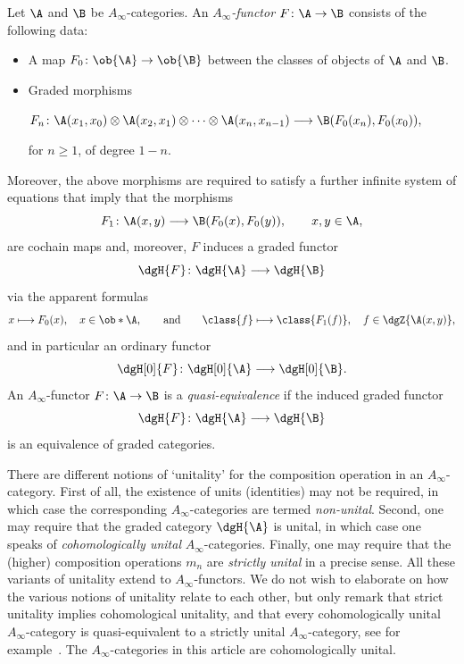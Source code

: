 \documentclass[a4paper]{amsart}
\begin{document}
Let $\A$ and $\B$ be $A_\infty$-categories. An \emph{$A_\infty$-functor}
$F\colon\A\to\B$ consists of the following data:
\begin{itemize}
\item A map $F_0\colon\ob{\A}\to\ob{\B}$ between the classes of objects of $\A$
  and $\B$.
\item Graded morphisms
  \begin{center}
    $F_n\colon\A(x_1,x_0)\otimes\A(x_2,x_1)\otimes\cdots\otimes\A(x_n,x_{n-1})\longrightarrow\B(F_0(x_n),F_0(x_0)),$
  \end{center}
  for $n\geq 1$, of degree $1-n$.
\end{itemize}
Moreover, the above morphisms are required to satisfy a further infinite system
of equations that imply that the morphisms
\[
  F_1\colon\A(x,y)\longrightarrow\B(F_0(x),F_0(y)),\qquad x,y\in\A,
\]
are cochain maps and, moreover, $F$ induces a graded functor
\[
  \dgH{F}\colon\dgH{\A}\longrightarrow\dgH{\B}
\]
via the apparent formulas
\[
  x\longmapsto F_0(x),\quad x\in\ob*{\A},\qquad\text{and}\qquad
  \class{f}\longmapsto \class{F_1(f)},\quad f\in\dgZ{\A(x,y)},
\]
and in particular an ordinary functor
\[
  \dgH[0]{F}\colon\dgH[0]{\A}\longrightarrow\dgH[0]{\B}.
\]
An $A_\infty$-functor $F\colon\A\to\B$ is a \emph{quasi-equivalence} if the
induced graded functor
\[
  \dgH{F}\colon\dgH{\A}\longrightarrow\dgH{\B}
\]
is an equivalence of graded categories.

\begin{remark}
  There are different notions of `unitality' for the composition operation in an
  $A_\infty$-category. First of all, the existence of units (identities) may not
  be required, in which case the corresponding $A_\infty$-categories are termed
  \emph{non-unital}. Second, one may require that the graded category $\dgH{\A}$ is
  unital, in which case one speaks of \emph{cohomologically unital}
  $A_\infty$-categories. Finally, one may require that the (higher) composition
  operations $m_n$ are \emph{strictly unital} in a precise sense. All these
  variants of unitality extend to $A_\infty$-functors. We do not wish to
  elaborate on how the various notions of unitality relate to each other, but
  only remark that strict unitality implies cohomological unitality, and that
  every cohomologically unital $A_\infty$-category is quasi-equivalent to a
  strictly unital $A_\infty$-category, see for example~\cite[Sec.~I.2a]{Sei08}.
  The $A_\infty$-categories in this article are cohomologically unital.
\end{remark}
\end{document}
